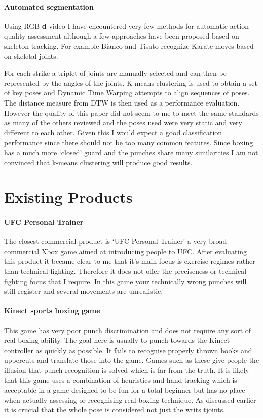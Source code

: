  \paragraph{Automated segmentation}
 Using RGB-{\bf d} video I have encountered very few methods for automatic action quality assessment although a few approaches have been proposed based on skeleton tracking. 
For example Bianco and Tisato recognize Karate moves based on skeletal joints.\cite{karate}

For each strike a triplet of joints are manually selected and can then be represented by the angles of the joints. K-means clustering is used to obtain a set of key poses and Dynamic Time Warping attempts to align sequences of poses. The distance measure from DTW is then used as a performance evaluation. However the quality of this paper did not seem to me to meet the same standards as many of the others reviewed and the poses used were very static and very different to each other.
Given this I would expect a good classification performance since there should not be too many common features. Since boxing has a much more `closed' guard and the punches share many similarities I am not convinced that k-means clustering will produce good results.


\section{Existing Products}
\paragraph{UFC Personal Trainer}
The closest commercial product is `UFC Personal Trainer' a very broad commercial Xbox game aimed at introducing people to UFC. After evaluating this product it became clear to me that it’s main focus is  exercise regimes rather than technical fighting. Therefore it does not offer the preciseness or technical fighting focus that I require. In this game your technically wrong punches will still register and several movements are unrealistic.

\paragraph{Kinect sports boxing game}
This game has very poor punch discrimination and does not require any sort of real boxing ability. The goal here is usually to punch towards the Kinect controller as quickly as possible. It fails to recognise properly thrown hooks and uppercuts and translate those into the game. 
Games such as these give people the illusion that punch recognition is solved which is far from the truth. It is likely that this game uses a combination of heuristics and hand tracking which is acceptable in a game designed to be fun for a total beginner but has no place when actually assessing or recognising real boxing technique. As discussed earlier it is crucial that the whole pose is considered not just the writs tjoints.

